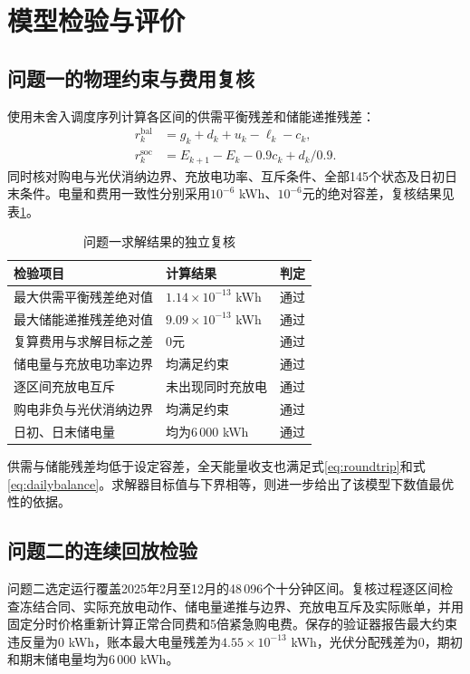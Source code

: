 \section{模型检验与评价}
\subsection{问题一的物理约束与费用复核}
使用未舍入调度序列计算各区间的供需平衡残差和储能递推残差：
\begin{align}
 r_k^{\mathrm{bal}}&=g_k+d_k+u_k-\ell_k-c_k,\\
 r_k^{\mathrm{soc}}&=E_{k+1}-E_k-0.9c_k+d_k/0.9.
\end{align}
同时核对购电与光伏消纳边界、充放电功率、互斥条件、全部145个状态及日初日末条件。电量和费用一致性分别采用$10^{-6}$ kWh、$10^{-6}$元的绝对容差，复核结果见表\ref{tab:validation}。
\begin{table}[!htbp]
\centering
\caption{问题一求解结果的独立复核}
\label{tab:validation}
\small
\begin{tabular}{lll}
\toprule
检验项目 & 计算结果 & 判定 \\
\midrule
最大供需平衡残差绝对值 & $1.14\times10^{-13}$ kWh & 通过 \\
最大储能递推残差绝对值 & $9.09\times10^{-13}$ kWh & 通过 \\
复算费用与求解目标之差 & 0元 & 通过 \\
储电量与充放电功率边界 & 均满足约束 & 通过 \\
逐区间充放电互斥 & 未出现同时充放电 & 通过 \\
购电非负与光伏消纳边界 & 均满足约束 & 通过 \\
日初、日末储电量 & 均为6\,000 kWh & 通过 \\
\bottomrule
\end{tabular}
\end{table}
供需与储能残差均低于设定容差，全天能量收支也满足式\eqref{eq:roundtrip}和式\eqref{eq:dailybalance}。求解器目标值与下界相等，则进一步给出了该模型下数值最优性的依据。

\subsection{问题二的连续回放检验}
问题二选定运行覆盖2025年2月至12月的48\,096个十分钟区间。复核过程逐区间检查冻结合同、实际充放电动作、储电量递推与边界、充放电互斥及实际账单，并用固定分时价格重新计算正常合同费和5倍紧急购电费。保存的验证器报告最大约束违反量为0 kWh，账本最大电量残差为$4.55\times10^{-13}$ kWh，光伏分配残差为0，期初和期末储电量均为6\,000 kWh。

